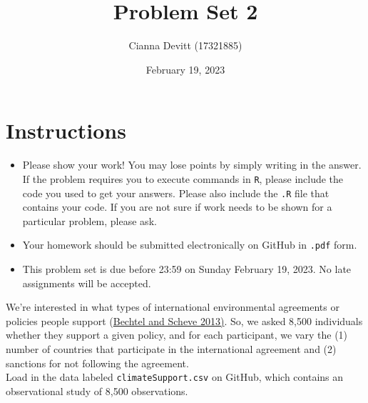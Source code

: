 \documentclass[12pt,letterpaper]{article}
\title{Problem Set 2}
\date{February 19, 2023}
\author{Cianna Devitt (17321885)}
\begin{document}
	\maketitle
	\section*{Instructions}
	\begin{itemize}
		\item Please show your work! You may lose points by simply writing in the answer. If the problem requires you to execute commands in \texttt{R}, please include the code you used to get your answers. Please also include the \texttt{.R} file that contains your code. If you are not sure if work needs to be shown for a particular problem, please ask.
		\item Your homework should be submitted electronically on GitHub in \texttt{.pdf} form.
		\item This problem set is due before 23:59 on Sunday February 19, 2023. No late assignments will be accepted.
	\end{itemize}
	
	
	
	
	\vspace{.25cm}
\noindent We're interested in what types of international environmental agreements or policies people support (\href{https://www.pnas.org/content/110/34/13763}{Bechtel and Scheve 2013)}. So, we asked 8,500 individuals whether they support a given policy, and for each participant, we vary the (1) number of countries that participate in the international agreement and (2) sanctions for not following the agreement. \\

\noindent Load in the data labeled \texttt{climateSupport.csv} on GitHub, which contains an observational study of 8,500 observations.
\end{document}
